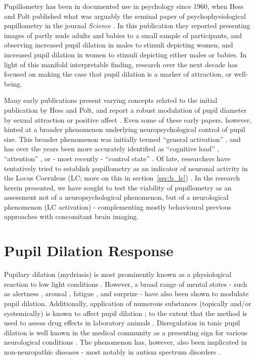 	Pupillometry has been in documented use in psychology since 1960, when Hess and Polt published what was arguably the seminal paper of psychophysiological pupillometry in the journal \textit{Science} \citep{HESS1960}.
	In this publication they reported presenting images of partly nude adults and babies to a small sample of participants, and observing increased pupil dilation in males to stimuli depicting women, and increased pupil dilation in women to stimuli depicting either males or babies.
	In light of this manifold interpretable finding, research over the next decade has focused on making the case that pupil dilation is a marker of attraction, or well-being.
	
	Many early publications present varying concepts related to the initial publication by Hess and Polt, and report a robust modulation of pupil diameter by sexual attraction \citep{Goldwater1972, HESS1965} or positive affect \citep{Nunally1967, Bradshaw1967}.
	Even some of these early papers, however, hinted at a broader phenomenon underlying neuropsychological control of pupil size.
	This broader phenomenon was initially termed “general activation” \citep{Nunally1967}, and has over the years been more accurately identified as “cognitive load” \citep{Laeng2011,Zekveld2011}, “attention” \citep{Wykowska2013,Kraemer2000}, or - most recently - “control state” \citep{Hayes2013}.
	Of late, researchers have tentatively tried to establish pupillometry as an indicator of neuronal activity in the Locus Coeruleus (LC; more on this in section~\ref{sec:b_lc}) \citep{Gilzenrat2010}.
	In the research herein presented, we have sought to test the viability of pupillometry as an assessment not of a neuropsychological phenomenon, but of a neurological phenomenon (LC activation) - 
	complementing mostly behavioural previous approaches \citep{Gilzenrat2010,Granholm2004} with concomitant brain imaging.
	
    \section{Pupil Dilation Response}
	Pupilary dilation (mydriasis) is most prominently known as a physiological reaction to low light conditions \citep{Ellis1981}. 
	However, a broad range of mental states - 
	such as alertness \citep{Yoss1970}, arousal \citep{Bradshaw1967}, fatigue \citep{Morad2000}, and surprize \citep{Preuschoff2011} -
	have also been shown to modulate pupil dilation.
	Additionally, application of numerous substances (topically and/or systemically) is known to affect pupil dilation \citep{Theofilopoulos1988, Bye1979, Phillips2000}; to the extent that the method is used to assess drug effects in laboratory animals \citep{Murray1981}.
	Disregulation in tonic pupil dilation is well known in the medical community as a presenting sign for various neurological conditions \citep{Caglayan2013}.
	The phenomenon has, however, also been implicated in non-neuropathic diseases - most notably in autism spectrum disorders \citep{Anderson2013}.
	
